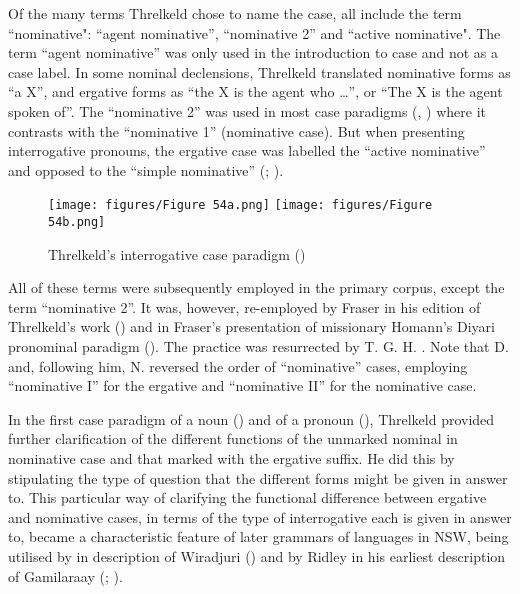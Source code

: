 Of the many terms Threlkeld chose to name the case, all include the term “nominative": ``agent nominative'', “nominative 2” and “active nominative". The term “agent nominative” was only used in the introduction to case and not as a case label. In some nominal declensions, Threlkeld translated nominative forms as “a X'', and ergative forms as “the X is the agent who …'', or “The X is the agent spoken of”. The “nominative 2” was used in most case paradigms (, ) where it contrasts with the “nominative 1” (nominative case). But when presenting interrogative pronouns, the ergative case was labelled the “active nominative” and opposed to the “simple nominative” (\citeyear[7]{threlkeld_australian_1834}; ).
 
\begin{figure}
\texttt{[image: figures/Figure 54a.png]}
\texttt{[image: figures/Figure 54b.png]}
\caption{Threlkeld’s interrogative case paradigm (\citeyear[7–8]{threlkeld_australian_1834})}
\label{fig:3:54}
\end{figure}


All of these terms were subsequently employed in the primary corpus, except the term ``nominative 2''. It was, however, re-employed by Fraser in his edition of Threlkeld’s work (\citeyear{fraser_australian_1892}) and in Fraser’s presentation of missionary Homann’s Diyari pronominal paradigm (\citeyear{fraser_australian_1892}). The practice was resurrected by T. G. H. \citet{strehlow_aranda_1944}. Note that D. \citet[207]{trudinger_grammar_1943} and, following him, N. \citet[3]{tindale_pitjantjatjara_1963} reversed the order of “nominative” cases, employing “nominative I” for the ergative and “nominative II” for the nominative case.

In the first case paradigm of a noun () and of a pronoun (), Threlkeld provided further clarification of the different functions of the unmarked nominal in nominative case and that marked with the ergative suffix. He did this by stipulating the type of question that the different forms might be given in answer to. This particular way of clarifying the functional difference between ergative and nominative cases, in terms of the type of interrogative each is given in answer to, became a characteristic feature of later grammars of languages in NSW, being utilised by \citet{gunther_native_1838} in description of Wiradjuri () and by Ridley in his earliest description of Gamilaraay (\citeyear{ridley_kamilaroi_1856}; ).


